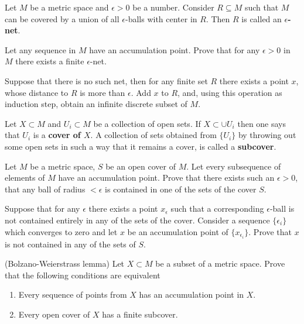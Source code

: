 \documentclass[12pt]{article}
\begin{document}
\begin{opredelenie} Let $M$ be a %
metric space and $\epsilon > 0$ be a number. 
Consider $R\subseteq M$ such that $M$ can be covered by
  a union of all $\epsilon$-balls with center in $R$. Then $R$ is
  called an {\bf $\epsilon$-net}.
\end{opredelenie}

\begin{zadacha} Let any sequence in $M$ have an accumulation
  point. Prove that for any $\epsilon >0$ in $M$ there exists a
  finite $\epsilon$-net.
\end{zadacha}

\begin{ukazanie} 
  Suppose that there is no such net, then for any finite set $R$
  there exists a point $x$, whose distance to $R$ is more than
  $\epsilon$. Add $x$ to $R$, and, using this operation as induction
  step, obtain an infinite discrete subset of $M$.
\end{ukazanie}

\begin{opredelenie} Let $X\subset M$ and $U_i\subset M$ be
  a collection of open sets.  
If $X \subset \cup U_i$ then one says that $U_i$ is a {\bf cover of $X$}. 
A collection of sets obtained from
  $\{U_i\}$ by throwing out some open sets in such a way that it remains 
  a cover, is called a {\bf subcover}.
\end{opredelenie}

\begin{zadacha} \label{_shar_v_pokry_Zadacha_} Let $M$ be a metric
  space, $S$ be an open cover of $M$.  Let every subsequence of elements
  of $M$ have an accumulation point. Prove that there exists such an
  $\epsilon>0$, that any ball of radius $<\epsilon$ is contained in
  one of the sets of the cover $S$.
\end{zadacha}

\begin{ukazanie} 
Suppose that for any $\epsilon$ there exists a point $x_\epsilon$ such that a
corresponding $\epsilon$-ball is not contained entirely in any of the
sets of the cover. Consider a sequence $\{\epsilon_i\}$
which converges to zero and let $x$ be an accumulation point
of $\{x_{\epsilon_i}\}$. Prove that $x$ is not contained in any of the sets
of $S$.
\end{ukazanie}

\begin{zadacha}[!]\label{comp.defn}
(Bolzano-Weierstrass lemma) 
Let $X\subset M$ be a subset of a metric space. Prove that the
following conditions are equivalent
\begin{enumerate}
\item Every sequence of points from $X$ has an accumulation point in
  $X$. 
\item Every open cover of $X$ has a finite subcover.
\end{enumerate}
\end{zadacha}
\end{document}
